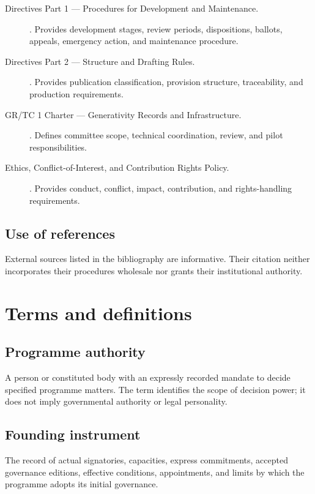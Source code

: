 \documentclass[11pt,a4paper]{article}
\begin{document}
\begin{description}
\item[Directives Part 1 --- Procedures for Development and Maintenance.] . Provides development stages, review periods, dispositions, ballots, appeals, emergency action, and maintenance procedure.
\item[Directives Part 2 --- Structure and Drafting Rules.] . Provides publication classification, provision structure, traceability, and production requirements.
\item[GR/TC 1 Charter --- Generativity Records and Infrastructure.] . Defines committee scope, technical coordination, review, and pilot responsibilities.
\item[Ethics, Conflict-of-Interest, and Contribution Rights Policy.] . Provides conduct, conflict, impact, contribution, and rights-handling requirements.
\end{description}

\subsection{Use of references}
External sources listed in the bibliography are informative. Their citation neither incorporates their procedures wholesale nor grants their institutional authority.

\section{Terms and definitions}
\subsection{Programme authority}
A person or constituted body with an expressly recorded mandate to decide specified programme matters. The term identifies the scope of decision power; it does not imply governmental authority or legal personality.

\subsection{Founding instrument}
The record of actual signatories, capacities, express commitments, accepted governance editions, effective conditions, appointments, and limits by which the programme adopts its initial governance.
\end{document}
